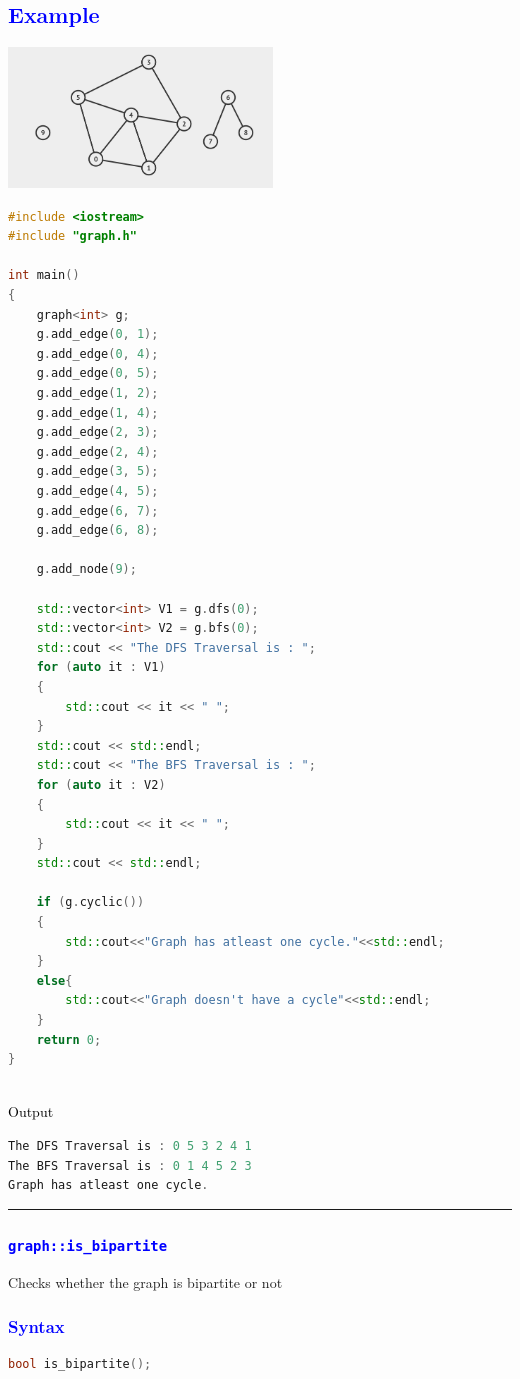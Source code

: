 \documentclass[11pt,a4paper]{article}
\begin{document}
\subsection*{\textcolor{blue}{\Large Example }}
\includegraphics[width=70mm]{example2.png}
\begin{lstlisting}[language=C++]
 #include <iostream>
#include "graph.h"

int main()
{
    graph<int> g;
    g.add_edge(0, 1);
    g.add_edge(0, 4);
    g.add_edge(0, 5);
    g.add_edge(1, 2);
    g.add_edge(1, 4);
    g.add_edge(2, 3);
    g.add_edge(2, 4);
    g.add_edge(3, 5);
    g.add_edge(4, 5);
    g.add_edge(6, 7);
    g.add_edge(6, 8);

    g.add_node(9);

    std::vector<int> V1 = g.dfs(0);
    std::vector<int> V2 = g.bfs(0);
    std::cout << "The DFS Traversal is : ";
    for (auto it : V1)
    {
        std::cout << it << " ";
    }
    std::cout << std::endl;
    std::cout << "The BFS Traversal is : ";
    for (auto it : V2)
    {
        std::cout << it << " ";
    }
    std::cout << std::endl;

    if (g.cyclic())
    {
        std::cout<<"Graph has atleast one cycle."<<std::endl;
    }
    else{
        std::cout<<"Graph doesn't have a cycle"<<std::endl;
    }
    return 0;
}

\end{lstlisting}
\\
{\textcolor{black}{\normalsize Output }}
\begin{lstlisting}[language=C++]
The DFS Traversal is : 0 5 3 2 4 1 
The BFS Traversal is : 0 1 4 5 2 3 
Graph has atleast one cycle.

\end{lstlisting}
\rule{17cm}{0.1mm}
\subsubsection*{\textcolor{blue}{\Large\texttt{graph::is\_bipartite}}}
Checks whether the graph is bipartite or not
\subsubsection*{\textcolor{blue}{ \large {Syntax}}}
\begin{lstlisting}[language=C++]
bool is_bipartite();
\end{lstlisting}
\end{document}
